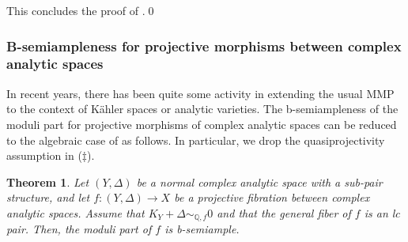\documentclass{amsart}
\newtheorem{thm}[theorem]{Theorem}
\theoremstyle{definition}
\theoremstyle{remark}
\numberwithin{equation}{section}
\begin{document}
This concludes the proof of .\qed
\subsubsection{B-semiampleness for projective morphisms between complex analytic spaces}In recent years, there has been quite some activity in extending the usual MMP to the context of K\"ahler spaces or analytic varieties.
The  b-semiampleness of the moduli part for projective morphisms of complex analytic spaces can be reduced to the algebraic case of 
as follows. In particular, we drop the quasiprojectivity assumption in ($\ddagger$).

\begin{thm}\label{thm:bsemiampleanal}
    Let $(Y,\Delta)$ be a normal complex analytic space with a sub-pair structure, and let $f \colon (Y,\Delta) \to X$ be a projective fibration between complex analytic spaces.
    Assume that $K_Y + \Delta \sim_{\mathbb Q,f} 0$ and that the general fiber of $f$ is an lc pair.
    Then, the moduli part of $f$
    is b-semiample.
\end{thm}
\end{document}
